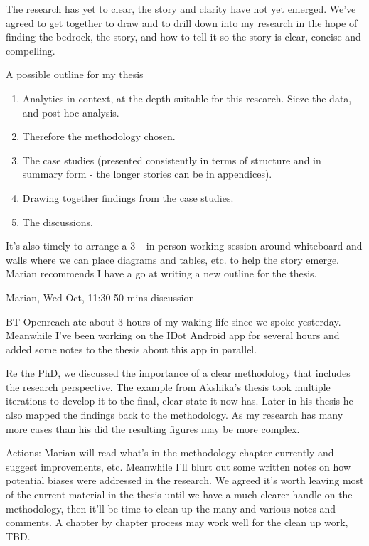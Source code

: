 The research has yet to clear, the story and clarity have not yet emerged. We've agreed to get together to draw and to drill down into my research in the hope of finding the bedrock, the story, and how to tell it so the story is clear, concise and compelling.

A possible outline for my thesis
\begin{enumerate}
    \item Analytics in context, at the depth suitable for this research. Sieze the data, and post-hoc analysis. 
    \item Therefore the methodology chosen.
    \item The case studies (presented consistently in terms of structure and in summary form - the longer stories can be in appendices).
    \item Drawing together findings from the case studies.
    \item The discussions. 
\end{enumerate}

It's also timely to arrange a 3+ in-person working session around whiteboard and walls where we can place diagrams and tables, etc. to help the story emerge. 
Marian recommends I have a go at writing a new outline for the thesis. 

\dotfill
Marian, Wed  Oct, 11:30 50 mins discussion

BT Openreach ate about 3 hours of my waking life since we spoke yesterday. Meanwhile I've been working on the IDot Android app for several hours and added some notes to the thesis about this app in parallel.

Re the PhD, we discussed the importance of a clear methodology that includes the research perspective. The example from Akshika's thesis took multiple iterations to develop it to the final, clear state it now has. Later in his thesis he also mapped the findings back to the methodology. As my research has many more cases than his did the resulting figures may be more complex. 

Actions: Marian will read what's in the methodology chapter currently and suggest improvements, etc. Meanwhile I'll blurt out some written notes on how potential biases were addressed in the research. We agreed it's worth leaving most of the current material in the thesis until we have a much clearer handle on the methodology, then it'll be time to clean up the many and various notes and comments. A chapter by chapter process may work well for the clean up work, TBD.

\dotfill
\clearpage